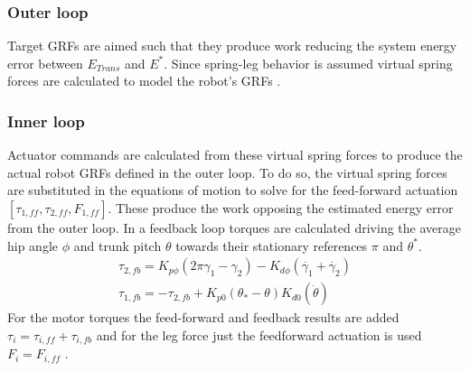 \documentclass[10pt, conference]{IEEEtran}
\begin{document}
\subsubsection{Outer loop}
Target GRFs are aimed such that they produce work reducing the system energy error between \({E}_{Trans}\) and \({E}^{*}\). Since spring-leg behavior is assumed 
virtual spring forces are calculated to model the robot's GRFs \cite{Wu2014}.
\subsubsection{Inner loop}
Actuator commands are calculated from these virtual spring forces to produce the actual robot GRFs defined in the outer loop. To do so, the virtual spring forces are 
substituted in the equations of motion to solve for the feed-forward actuation \([{\tau}_{1,ff}, {\tau}_{2,ff}, {F}_{1,ff}]\). These produce the work opposing the estimated 
energy error from the outer loop. In a feedback loop torques are calculated driving the average hip angle \({\phi}\) and trunk pitch \({\theta}\) towards their stationary references \({\pi}\) and \({\theta}^{*}\).
\begin{equation}
   \label{eq:t}
   \begin{aligned}
   {\tau}_{2,fb}={K}_{p{\phi}}(2{\pi}{\gamma}_{1}-{\gamma}_{2})-{K}_{d{\phi}}(\dot{{\gamma}_{1}}+\dot{{\gamma}_{2}})\\
   {\tau}_{1,fb}=-{\tau}_{2,fb}+{K}_{p0}({\theta}_{*}-{\theta}){K}_{d0}(\dot{\theta})
   \end{aligned}
\end{equation}
For the motor torques the feed-forward and feedback results are added \({\tau}_{i}={\tau}_{i,ff}+{\tau}_{i,fb}\) and for the leg force just the feedforward actuation is used \({F}_{i}={F}_{i,ff}\) \cite{Wu2014}.
\end{document}
